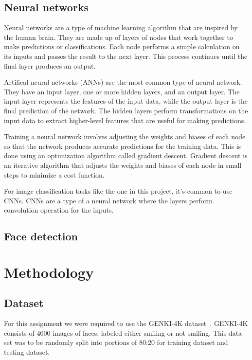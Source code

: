 \documentclass[12pt,a4paper,english
]{tunithesis}
\begin{document}
\setcounter{page}{1} 
\section{Neural networks}
Neural networks are a type of machine learning algorithm that are inspired by the human brain. They are made up of layers of nodes that work together to make predictions or classifications. Each node performs a simple calculation on its inputs and passes the result to the next layer. This process continues until the final layer produces an output.

Artifical neural networks (ANNs) are the most common type of neural network. They have an input layer, one or more hidden layers, and an output layer. The input layer represents the features of the input data, while the output layer is the final prediction of the network. The hidden layers perform transformations on the input data to extract higher-level features that are useful for making predictions.

Training a neural network involves adjusting the weights and biases of each node so that the network produces accurate predictions for the training data. This is done using an optimization algorithm called gradient descent. Gradient descent is an iterative algorithm that adjusts the weights and biases of each node in small steps to minimize a cost function.

For image classification tasks like the one in this project, it's common to use CNNs. CNNs are a type of a neural network where the layers perform convolution operation for the inputs.

\section{Face detection}


\chapter{Methodology}
\label{sec:methodology}
\section{Dataset}
For this assignment we were required to use the GENKI-4K dataset~\cite{genki}. GENKI-4K consists of 4000 images of faces, labeled either smiling or not smiling. This data set was to be randomly split into portions of 80:20 for training dataset and testing dataset.
\end{document}
